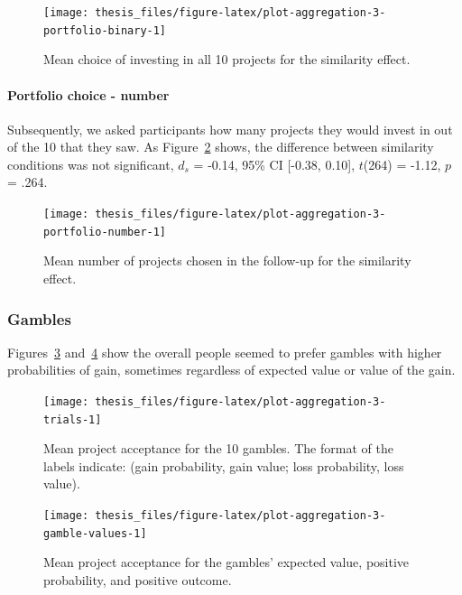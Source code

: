 \documentclass[a4paper, nobind, dvipsnames]{templates/ociamthesis}
\theoremstyle{definition}
\theoremstyle{definition}
\theoremstyle{definition}
\theoremstyle{definition}
\theoremstyle{remark}
\begin{document}
\begin{figure}
\texttt{[image: thesis\_files/figure-latex/plot-aggregation-3-portfolio-binary-1]} \caption{Mean choice of investing in all 10 projects for the similarity effect.}\label{fig:plot-aggregation-3-portfolio-binary}
\end{figure}

\paragraph{Portfolio choice - number}

Subsequently, we asked participants how many projects they would invest in out
of the 10 that they saw. As
Figure~\ref{fig:plot-aggregation-3-portfolio-number} shows, the difference
between similarity conditions was not significant,
\(d_s\) = -0.14, 95\% CI {[}-0.38, 0.10{]}, \(t\)(264) = -1.12, \(p\) = .264.



\begin{figure}
\texttt{[image: thesis\_files/figure-latex/plot-aggregation-3-portfolio-number-1]} \caption{Mean number of projects chosen in the follow-up for the similarity effect.}\label{fig:plot-aggregation-3-portfolio-number}
\end{figure}

\subsubsection{Gambles}

Figures~\ref{fig:plot-aggregation-3-trials}
and~\ref{fig:plot-aggregation-3-gamble-values} show the
overall people seemed to prefer gambles with higher probabilities of gain,
sometimes regardless of expected value or value of the gain.



\begin{figure}
\texttt{[image: thesis\_files/figure-latex/plot-aggregation-3-trials-1]} \caption{Mean project acceptance for the 10 gambles. The format of the labels indicate: (gain probability, gain value; loss probability, loss value).}\label{fig:plot-aggregation-3-trials}
\end{figure}




\begin{figure}
\texttt{[image: thesis\_files/figure-latex/plot-aggregation-3-gamble-values-1]} \caption{Mean project acceptance for the gambles'
expected value, positive probability, and positive outcome.}\label{fig:plot-aggregation-3-gamble-values}
\end{figure}
\end{document}

